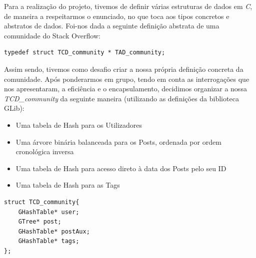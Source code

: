 \documentclass[a4paper, 11pt, oneside]{article}
\begin{document}
Para a realização do projeto, tivemos de definir várias estruturas de dados em \textit{C}, de maneira a respeitarmos o enunciado, no que toca aos tipos concretos e abstratos de dados. Foi-nos dada a seguinte definição abstrata de uma comunidade do Stack Overflow:

\begin{lstlisting}[caption=Definição da TAD\_community]
typedef struct TCD_community * TAD_community;
\end{lstlisting}

Assim sendo, tivemos como desafio criar a nossa própria definição concreta da comunidade. Após ponderarmos em grupo, tendo em conta as interrogações que nos apresentaram, a eficiência e o encapsulamento, decidimos organizar a nossa \textit{TCD\_community} da seguinte maneira (utilizando as definições da biblioteca GLib):
\begin{itemize}
\item Uma tabela de Hash para os Utilizadores
\item Uma árvore binária balanceada para os Posts, ordenada por ordem cronológica inversa
\item Uma tabela de Hash para acesso direto à data dos Posts pelo seu ID
\item Uma tabela de Hash para as Tags
\end{itemize}
\begin{lstlisting}[caption=Definição da TCD\_community]
struct TCD_community{
	GHashTable* user;
	GTree* post;
	GHashTable* postAux;
	GHashTable* tags;	
};
\end{lstlisting}
\end{document}
